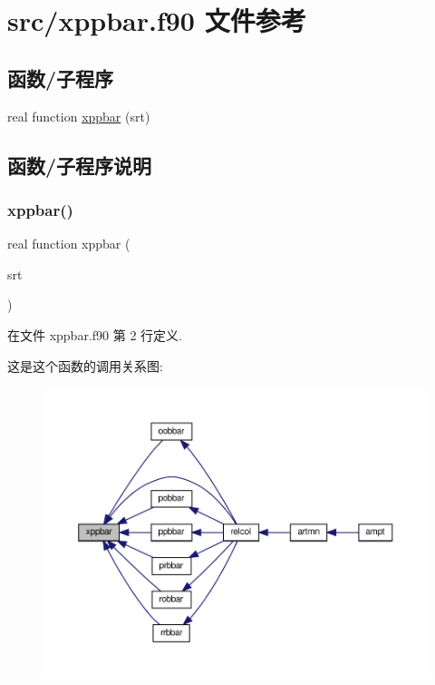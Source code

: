 \hypertarget{xppbar_8f90}{}\section{src/xppbar.f90 文件参考}
\label{xppbar_8f90}
\subsection*{函数/子程序}
\begin{DoxyCompactItemize}
\item 
real function \mbox{\hyperlink{xppbar_8f90_aa3a793ad1fb5aaa1cf1ac60000afb6ee}{xppbar}} (srt)
\end{DoxyCompactItemize}


\subsection{函数/子程序说明}
\mbox{\label{xppbar_8f90_aa3a793ad1fb5aaa1cf1ac60000afb6ee}} 
\subsubsection{\texorpdfstring{xppbar()}{xppbar()}}
{\footnotesize\ttfamily real function xppbar (\begin{DoxyParamCaption}\item[{}]{srt }\end{DoxyParamCaption})}



在文件 xppbar.\+f90 第 2 行定义.

这是这个函数的调用关系图\+:
\nopagebreak
\begin{figure}[H]
\begin{center}
\leavevmode
\includegraphics[width=350pt]{xppbar_8f90_aa3a793ad1fb5aaa1cf1ac60000afb6ee_icgraph}
\end{center}
\end{figure}
